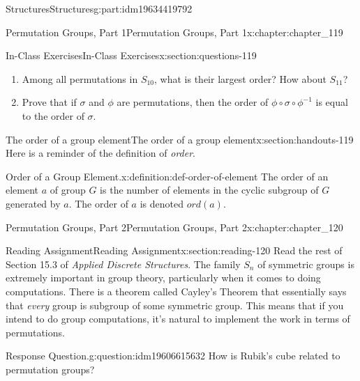 \documentclass[oneside,10pt,]{book}
\numberwithin{equation}{section}
\begin{document}
\begin{partptx}{Structures}{}{Structures}{}{}{g:part:idm19634419792}
\begin{chapterptx}{Permutation Groups, Part 1}{}{Permutation Groups, Part 1}{}{}{x:chapter:chapter_119}
\begin{sectionptx}{In-Class Exercises}{}{In-Class Exercises}{}{}{x:section:questions-119}
\begin{enumerate}[label=\arabic*.]
\begin{multicols}{3}
\end{multicols}
%
\item{}Among all permutations in \(S_{10}\), what is their largest order?  How about \(S_{11}\)?%
\item{}Prove that if \(\sigma\) and \(\phi\) are permutations, then the order of \(\phi \circ \sigma \circ \phi^{-1}\) is equal to the order of \(\sigma\).%
\end{enumerate}
%
\end{sectionptx}
%
%
\typeout{************************************************}
\typeout{************************************************}
%
\begin{sectionptx}{The order of a group element}{}{The order of a group element}{}{}{x:section:handouts-119}
Here is a reminder of the definition of \emph{order}.%
\begin{definition}{Order of a Group Element.}{x:definition:def-order-of-element}%
%
\label{g:notation:idm19606623440}%
The order of an element \(a\) of group \(G\) is the number of elements in the cyclic subgroup of \(G\) generated by \(a\). The order of \(a\) is denoted \(ord(a)\).%
\end{definition}
\end{sectionptx}
\end{chapterptx}
%
\typeout{************************************************}
\typeout{************************************************}
%
\begin{chapterptx}{Permutation Groups, Part 2}{}{Permutation Groups, Part 2}{}{}{x:chapter:chapter_120}
\index{}%
%
%
\typeout{************************************************}
\typeout{************************************************}
%
\begin{sectionptx}{Reading Assignment}{}{Reading Assignment}{}{}{x:section:reading-120}
Read the rest of  Section 15.3 of \emph{Applied Discrete Structures}. The family \(S_n\) of symmetric groups is extremely important in group theory, particularly when it comes to doing computations.   There is a theorem called Cayley's Theorem that essentially says that \emph{every} group is  subgroup of some symmetric group.  This means that if you intend to do group computations, it's natural to implement the work in terms of permutations.%
\begin{question}{Response Question.}{g:question:idm19606615632}%
How is Rubik's cube related to permutation groups?%

\end{question}
\end{sectionptx}
\end{chapterptx}
\end{partptx}
\end{document}

